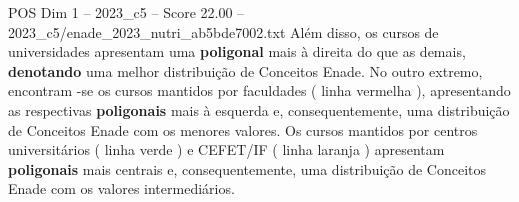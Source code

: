 \begin{textsample}{POS Dim 1 – 2023\_c5 – Score 22.00 – 2023\_c5/enade\_2023\_nutri\_ab5bde7002.txt}
Além disso, os cursos de universidades apresentam uma \textbf{poligonal} mais à direita do que as demais, \textbf{denotando} uma melhor distribuição de Conceitos Enade.
No outro extremo, encontram -se os cursos mantidos por faculdades ( linha vermelha ), apresentando as respectivas \textbf{poligonais} mais à esquerda e, consequentemente, uma distribuição de Conceitos Enade com os menores valores.
Os cursos mantidos por centros universitários ( linha verde ) e CEFET/IF ( linha laranja ) apresentam \textbf{poligonais} mais centrais e, consequentemente, uma distribuição de Conceitos Enade com os valores intermediários.

\end{textsample}
